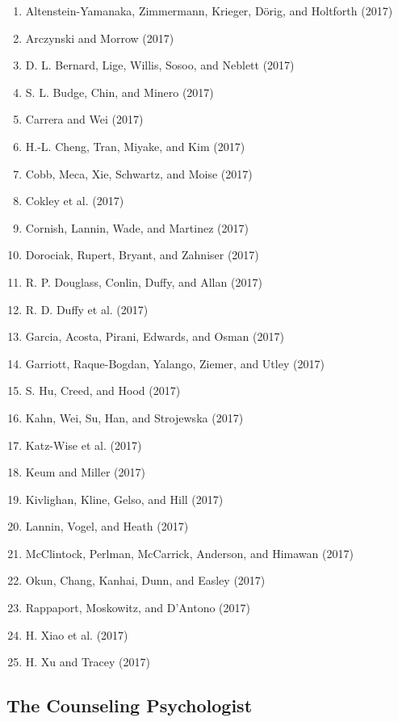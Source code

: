 \documentclass[english,man]{apa6}
\providecommand{\tightlist}{%
  \setlength{\itemsep}{0pt}\setlength{\parskip}{0pt}}
\theoremstyle{definition}
\theoremstyle{definition}
\theoremstyle{definition}
\theoremstyle{remark}
\begin{document}
\begin{enumerate}
\def\labelenumi{\arabic{enumi})}
\tightlist
\item
  Altenstein-Yamanaka, Zimmermann, Krieger, Dörig, and Holtforth (2017)
\item
  Arczynski and Morrow (2017)
\item
  D. L. Bernard, Lige, Willis, Sosoo, and Neblett (2017)
\item
  S. L. Budge, Chin, and Minero (2017)
\item
  Carrera and Wei (2017)
\item
  H.-L. Cheng, Tran, Miyake, and Kim (2017)
\item
  Cobb, Meca, Xie, Schwartz, and Moise (2017)
\item
  Cokley et al. (2017)
\item
  Cornish, Lannin, Wade, and Martinez (2017)
\item
  Dorociak, Rupert, Bryant, and Zahniser (2017)
\item
  R. P. Douglass, Conlin, Duffy, and Allan (2017)
\item
  R. D. Duffy et al. (2017)
\item
  Garcia, Acosta, Pirani, Edwards, and Osman (2017)
\item
  Garriott, Raque-Bogdan, Yalango, Ziemer, and Utley (2017)
\item
  S. Hu, Creed, and Hood (2017)
\item
  Kahn, Wei, Su, Han, and Strojewska (2017)
\item
  Katz-Wise et al. (2017)
\item
  Keum and Miller (2017)
\item
  Kivlighan, Kline, Gelso, and Hill (2017)
\item
  Lannin, Vogel, and Heath (2017)
\item
  McClintock, Perlman, McCarrick, Anderson, and Himawan (2017)
\item
  Okun, Chang, Kanhai, Dunn, and Easley (2017)
\item
  Rappaport, Moskowitz, and D'Antono (2017)
\item
  H. Xiao et al. (2017)
\item
  H. Xu and Tracey (2017)
\end{enumerate}

\subsection{The Counseling
Psychologist}\label{the-counseling-psychologist}
\end{document}
